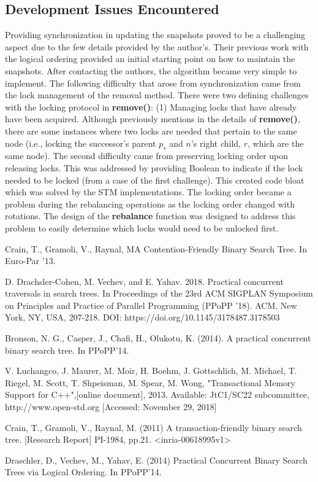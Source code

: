 \documentclass[conference]{IEEEtran}
\theoremstyle{definition}
\theoremstyle{theorem}
\begin{document}
\subsection{Development Issues Encountered}
Providing synchronization in updating the snapshots proved to be a challenging aspect due to the few details provided by the author's. Their previous work with the logical ordering provided an initial starting point on how to maintain the snapshots. After contacting the authors, the algorithm became very simple to implement. The following difficulty that arose from synchronization came from the lock management of the removal method. There were two defining challenges with the locking protocol in \textbf{remove()}: (1) Managing locks that have already have been acquired. Although previously mentions in the details of \textbf{remove()}, there are some instances where two locks are needed that pertain to the same node (i.e., locking the successor's parent $p_s$ and $n$'s right child, $r$, which are the same node). The second difficulty came from preserving locking order upon releasing locks. This was addressed by providing Boolean to indicate if the lock needed to be locked (from a case of the first challenge). This created code bloat which was solved by the STM implementations. The locking order became a problem during the rebalancing operations as the locking order changed with rotations. The design of the \textbf{rebalance} function was designed to address this problem to easily determine which locks would need to be unlocked first.

\begin{thebibliography}{00}

Crain, T., Gramoli, V., Raynal, MA Contention-Friendly Binary Search Tree. In Euro-Par '13.

 D. Drachsler-Cohen, M. Vechev, and E. Yahav. 2018. Practical concurrent traversals in search trees. In Proceedings of the 23rd ACM SIGPLAN Symposium on Principles and Practice of Parallel Programming (PPoPP '18). ACM, New York, NY, USA, 207-218. DOI: https://doi.org/10.1145/3178487.3178503

Bronson, N. G., Casper, J., Chafi, H., Olukotu, K. (2014). A practical concurrent binary search tree. In PPoPP'14.

 V. Luchangco, J. Maurer, M. Moir, H. Boehm, J. Gottschlich, M. Michael, T. Riegel, M. Scott, T. Shpeisman, M. Spear, M. Wong, "Transactional Memory Support for C++",[online document], 2013. Available: JtC1/SC22 subcommittee, http://www.open-std.org [Accessed: November 29, 2018]


Crain, T., Gramoli, V., Raynal, M. (2011) A transaction-friendly binary search tree.  [Research Report] PI-1984, pp.21. <inria-00618995v1>

Draschler, D., Vechev, M., Yahav, E. (2014) Practical Concurrent Binary Search Trees via Logical Ordering. In PPoPP'14.
\end{thebibliography}
\end{document}
